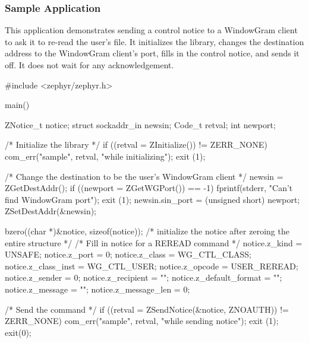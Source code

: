 \subsubsection{Sample Application}

This application demonstrates sending a control notice to a WindowGram
client to ask it to re-read the user's  file.  It
initializes the library, changes the destination address to the
WindowGram client's port, fills in the control notice, and sends it off.
It does not wait for any acknowledgement.

\begin{code}
#include <zephyr/zephyr.h>

main()
{
    ZNotice_t notice;
    struct sockaddr_in newsin;
    Code_t retval;
    int newport;

    /* Initialize the library */
    if ((retval = ZInitialize()) != ZERR_NONE) {
        com_err("sample", retval, "while initializing");
        exit (1);
    }

    /* Change the destination to be the user's WindowGram client */
    newsin = ZGetDestAddr();
    if ((newport = ZGetWGPort()) == -1) {
        fprintf(stderr, "Can't find WindowGram port\n");
        exit (1);
    }
    newsin.sin_port = (unsigned short) newport;
    ZSetDestAddr(&newsin);

    bzero((char *)&notice, sizeof(notice));
    /* initialize the notice after zeroing the entire structure */
    /* Fill in notice for a REREAD command */
    notice.z_kind = UNSAFE;
    notice.z_port = 0;
    notice.z_class = WG_CTL_CLASS;
    notice.z_class_inst = WG_CTL_USER;
    notice.z_opcode = USER_REREAD;
    notice.z_sender = 0;
    notice.z_recipient = "";
    notice.z_default_format = "";
    notice.z_message = "";
    notice.z_message_len = 0;

    /* Send the command */
    if ((retval = ZSendNotice(&notice, ZNOAUTH)) != ZERR_NONE) {
        com_err("sample", retval, "while sending notice");
        exit (1);
    }
    exit(0);
}
\end{code}
